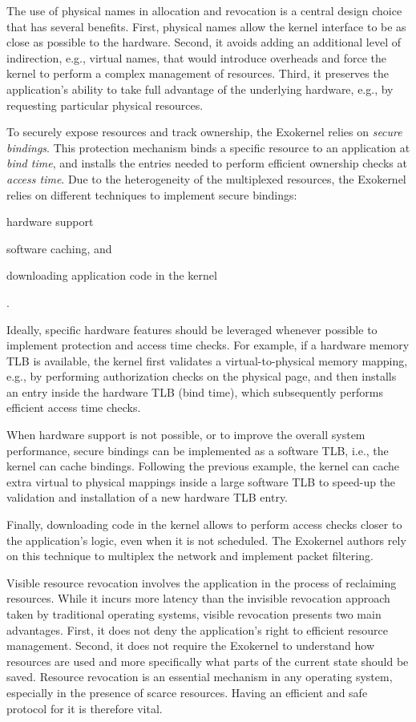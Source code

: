 The use of physical names in allocation and revocation is a central design choice that has several benefits.
First, physical names allow the kernel interface to be as close as possible to the hardware.
Second, it avoids adding an additional level of indirection, e.g., virtual names, that would introduce overheads and force the kernel to perform a complex management of resources.
Third, it preserves the application's ability to take full advantage of the underlying hardware, e.g., by requesting particular physical resources.

To securely expose resources and track ownership, the Exokernel relies on \emph{secure bindings}.
This protection mechanism binds a specific resource to an application at \emph{bind time}, and installs the entries needed to perform efficient ownership checks at \emph{access time}.
Due to the heterogeneity of the multiplexed resources, the Exokernel relies on different techniques to implement secure bindings:
\begin{enumerate*}
	\item hardware support
	\item software caching, and
	\item downloading application code in the kernel
\end{enumerate*}.

Ideally, specific hardware features should be leveraged whenever possible to implement protection and access time checks.
For example, if a hardware memory TLB is available, the kernel first validates a virtual-to-physical memory mapping, e.g., by performing authorization checks on the physical page, and then installs an entry inside the hardware TLB (bind time), which subsequently performs efficient access time checks.

When hardware support is not possible, or to improve the overall system performance, secure bindings can be implemented as a software TLB, i.e., the kernel can cache bindings.
Following the previous example, the kernel can cache extra virtual to physical mappings inside a large software TLB to speed-up the validation and installation of a new hardware TLB entry.

Finally, downloading code in the kernel allows to perform access checks closer to the application's logic, even when it is not scheduled.
The Exokernel authors rely on this technique to multiplex the network and implement packet filtering.

Visible resource revocation involves the application in the process of reclaiming resources.
While it incurs more latency than the invisible revocation approach taken by traditional operating systems, visible revocation presents two main advantages.
First, it does not deny the application's right to efficient resource management.
Second, it does not require the Exokernel to understand how resources are used and more specifically what parts of the current state should be saved.
Resource revocation is an essential mechanism in any operating system, especially in the presence of scarce resources.
Having an efficient and safe protocol for it is therefore vital.

